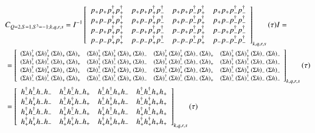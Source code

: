 \newcommand{\hdcor}[4]{h^\dagger_{#1}h^\dagger_{#2}h_{#3}h_{#4}}
\newcommand{\hcor}[4]{h_{#3}h_{#4}h^\dagger_{#1}h^\dagger_{#2}}
\renewcommand{\dscor}[4]{\left(\Sigma h\right)_{#1}^\dagger \left(\Sigma h\right)_{#2}^\dagger \left(\Sigma h\right)_{#3}\left(\Sigma h\right)_{#4}}
\begin{equation}
  \begin{aligned} 
    &C_{Q=2,S=1,S^3=-1;k,q,r,s} =
    I^{-1} \left[
    \begin{array}{cccc}
      \cor{+}{+}{+}{+} & \cor{+}{+}{+}{-} & \cor{+}{+}{-}{+} & \cor{+}{+}{-}{-} \\
      \cor{+}{-}{+}{+} & \cor{+}{-}{+}{-} & \cor{+}{-}{-}{+} & \cor{+}{-}{-}{-} \\
      \cor{-}{+}{+}{+} & \cor{-}{+}{+}{-} & \cor{-}{+}{-}{+} & \cor{-}{+}{-}{-} \\
      \cor{-}{-}{+}{+} & \cor{-}{-}{+}{-} & \cor{-}{-}{-}{+} & \cor{-}{-}{-}{-} \\
    \end{array}
    \right]_{k,q,r,s} (\tau) I = \\
    &= \left[\resizebox{\textwidth}{!}{%
    $
    \begin{array}{cccc}
      \dscor{+}{+}{+}{+} & \dscor{+}{+}{+}{-} & \dscor{+}{+}{-}{+} & \dscor{+}{+}{-}{-} \\
      \dscor{+}{-}{+}{+} & \dscor{+}{-}{+}{-} & \dscor{+}{-}{-}{+} & \dscor{+}{-}{-}{-} \\
      \dscor{-}{+}{+}{+} & \dscor{-}{+}{+}{-} & \dscor{-}{+}{-}{+} & \dscor{-}{+}{-}{-} \\
      \dscor{-}{-}{+}{+} & \dscor{-}{-}{+}{-} & \dscor{-}{-}{-}{+} & \dscor{-}{-}{-}{-} \\
    \end{array}$}
    \right]_{k,q,r,s} (\tau) \\
    &= \left[ 
    {\begin{array}{cccc}
      \hdcor{-}{-}{-}{-} & \hdcor{-}{-}{-}{+} & \hdcor{-}{-}{+}{-} & \hdcor{-}{-}{+}{+} \\
      \hdcor{-}{+}{-}{-} & \hdcor{-}{+}{-}{+} & \hdcor{-}{+}{+}{-} & \hdcor{-}{+}{+}{+} \\
      \hdcor{+}{-}{-}{-} & \hdcor{+}{-}{-}{+} & \hdcor{+}{-}{+}{-} & \hdcor{+}{-}{+}{+} \\
      \hdcor{+}{+}{-}{-} & \hdcor{+}{+}{-}{+} & \hdcor{+}{+}{+}{-} & \hdcor{+}{+}{+}{+} \\
    \end{array} } \right]_{k,q,r,s} (\tau) \\

\end{aligned}
\end{equation}

